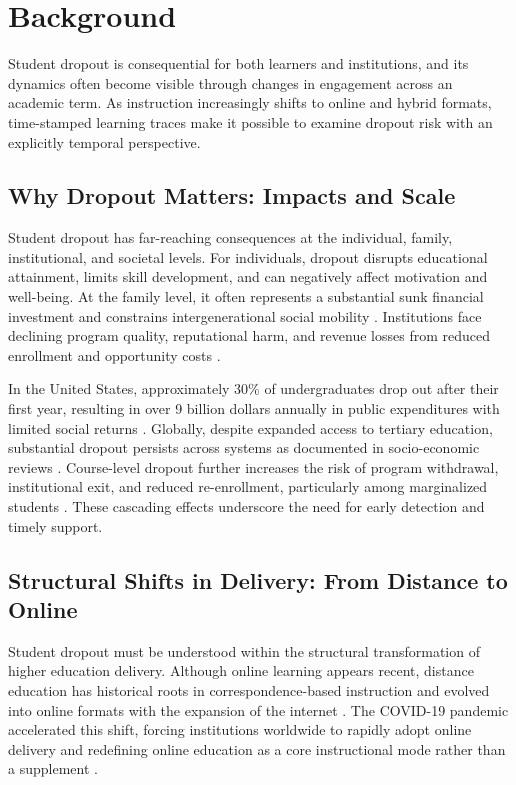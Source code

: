 \section{Background}
Student dropout is consequential for both learners and institutions, and its dynamics often become visible through changes in engagement across an academic term. As instruction increasingly shifts to online and hybrid formats, time-stamped learning traces make it possible to examine dropout risk with an explicitly temporal perspective.

\subsection{Why Dropout Matters: Impacts and Scale}
Student dropout has far-reaching consequences at the individual, family, institutional, and societal levels. For individuals, dropout disrupts educational attainment, limits skill development, and can negatively affect motivation and well-being. At the family level, it often represents a substantial sunk financial investment and constrains intergenerational social mobility \cite{Kamissa2020DroppingOut}. Institutions face declining program quality, reputational harm, and revenue losses from reduced enrollment and opportunity costs \cite{Guzman2021DropoutRural, Schneider2010FirstYearAttrition}.

In the United States, approximately 30\% of undergraduates drop out after their first year, resulting in over 9 billion dollars annually in public expenditures with limited social returns \cite{Schneider2010FirstYearAttrition}. Globally, despite expanded access to tertiary education, substantial dropout persists across systems as documented in socio-economic reviews \cite{Aina2022DeterminantsDropout}. Course-level dropout further increases the risk of program withdrawal, institutional exit, and reduced re-enrollment, particularly among marginalized students \cite{McKinney2019CourseDropping, Gicheva2025PersistenceIntroCourse}. These cascading effects underscore the need for early detection and timely support.

\subsection{Structural Shifts in Delivery: From Distance to Online}
Student dropout must be understood within the structural transformation of higher education delivery. Although online learning appears recent, distance education has historical roots in correspondence-based instruction and evolved into online formats with the expansion of the internet \cite{Kentnor2015DistanceEducation}. The COVID-19 pandemic accelerated this shift, forcing institutions worldwide to rapidly adopt online delivery and redefining online education as a core instructional mode rather than a supplement \cite{Bartolic2022COVIDTeaching, Bryson2020RapidAdoption, Zhang2023OnlineLearningReview}.


